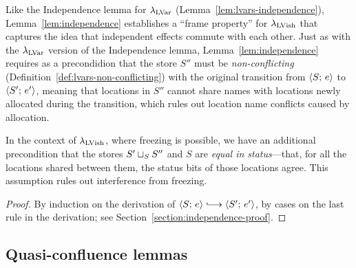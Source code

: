 Like the Independence lemma for $\lambda_{\textrm{LVar}}$
(Lemma~\ref{lem:lvars-independence}), Lemma~\ref{lem:independence}
establishes a ``frame property'' for $\lambda_{\textrm{LVish}}$ that captures the
idea that independent effects commute with each other.  Just as with
the $\lambda_{\textrm{LVar}}$ version of the Independence lemma,
Lemma~\ref{lem:independence} requires as a precondidion that the store
$S''$ must be \emph{non-conflicting}
(Definition~\ref{def:lvars-non-conflicting}) with the original
transition from $\langle S;\, e \rangle$ to $\langle S';\, e' \rangle$, meaning that
locations in $S''$ cannot share names with locations newly allocated
during the transition, which rules out location name conflicts caused
by allocation.

In the context of $\lambda_{\textrm{LVish}}$, where freezing is possible, we have
an additional precondition that the stores $S' \sqcup_{S} S''$ and
$S$ are \emph{equal in status}---that, for all the locations shared
between them, the status bits of those locations agree.  This
assumption rules out interference from freezing.

\DefEqualStatus

\LemIndependence
\begin{proof}
   By induction on the derivation of $\config{S}{e} \parstepsto
   \config{S'}{e'}$, by cases on the last rule in the derivation; see
   Section~\ref{section:independence-proof}.
\end{proof}

\subsection{Quasi-confluence lemmas}\label{subsection:quasi-quasi-confluence}



